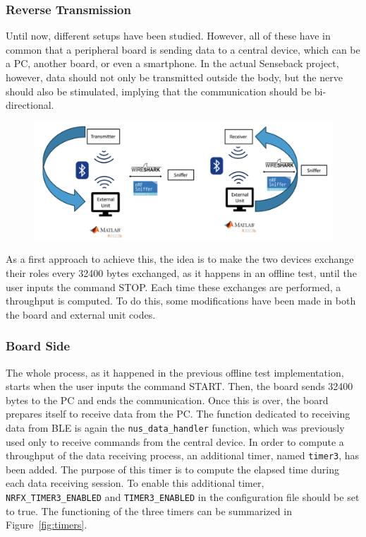 \documentclass{Configuration_Files/PoliMi3i_thesis}
\begin{document}
\subsubsection{Reverse Transmission}

Until now, different setups have been studied. However, all of these have in common that a peripheral board is sending data to a central device, which can be a PC, another board, or even a smartphone. In the actual Senseback project, however, data should not only be transmitted outside the body, but the nerve should also be stimulated, implying that the communication should be bi-directional.

\begin{figure}[H]
    \centering
    \includegraphics[scale=0.3]{Board Windows PC/9.png}
    \label{fig:nrf_connect_log}
\end{figure}

As a first approach to achieve this, the idea is to make the two devices exchange their roles every 32400 bytes exchanged, as it happens in an offline test, until the user inputs the command STOP. Each time these exchanges are performed, a throughput is computed. To do this, some modifications have been made in both the board and external unit codes.

\subsubsection{Board Side}

The whole process, as it happened in the previous offline test implementation, starts when the user inputs the command START. Then, the board sends 32400 bytes to the PC and ends the communication. Once this is over, the board prepares itself to receive data from the PC. The function dedicated to receiving data from BLE is again the \texttt{nus\_data\_handler} function, which was previously used only to receive commands from the central device. In order to compute a throughput of the data receiving process, an additional timer, named \texttt{timer3}, has been added. The purpose of this timer is to compute the elapsed time during each data receiving session. To enable this additional timer, \texttt{NRFX\_TIMER3\_ENABLED} and \texttt{TIMER3\_ENABLED} in the configuration file should be set to true. The functioning of the three timers can be summarized in Figure~\ref{fig:timers}.
\end{document}
